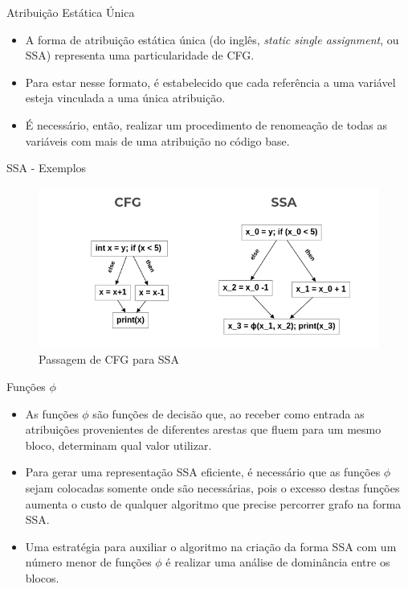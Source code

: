 \begin{frame}{Atribuição Estática Única}
    \begin{itemize}
        \item A forma de atribuição estática única (do inglês, \textit{static single assignment}, ou SSA) representa uma particularidade de CFG.

        \item Para estar nesse formato, é estabelecido que cada referência a uma variável esteja vinculada a uma única atribuição.

        \item É necessário, então, realizar um procedimento de renomeação de todas as variáveis com mais de uma atribuição no código base.
    \end{itemize}
\end{frame}

\begin{frame}{SSA - Exemplos}
    \begin{figure}
        \centering
        \includegraphics[width=.9\textwidth]{Figuras/ssa-cfg.png}
        \caption{Passagem de CFG para SSA}
        \label{fig:cfg-ssa}
    \end{figure}
\end{frame}

\begin{frame}{Funções $\phi$}
    \begin{itemize}
        \item As funções $\phi$ são funções de decisão que, ao receber como entrada as atribuições provenientes de diferentes arestas que fluem para um mesmo bloco, determinam qual valor utilizar.

        \item Para gerar uma representação SSA eficiente, é necessário que as funções $\phi$ sejam colocadas somente onde são necessárias, pois o excesso destas funções aumenta o custo de qualquer algoritmo que precise percorrer grafo na forma SSA.

        \item Uma estratégia para auxiliar o algoritmo na criação da forma SSA com um número menor de funções $\phi$ é realizar uma análise de dominância entre os blocos.
    \end{itemize}
\end{frame}

